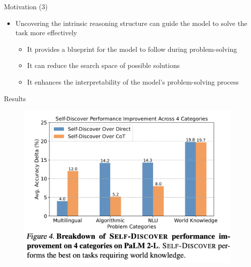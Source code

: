 \documentclass[aspectratio=169]{beamer}
\begin{document}
\begin{frame}{Motivation (3)}
\begin{itemize}
    \item Uncovering the intrinsic reasoning structure can guide the model to solve the task more effectively \pause
    \begin{itemize}
    \item It provides a blueprint for the model to follow during problem-solving \pause
    \item It can reduce the search space of possible solutions \pause
    \item It enhances the interpretability of the model's problem-solving process \pause
    \end{itemize}
\end{itemize}
\end{frame}

\begin{frame}{Results}
\begin{figure}
    \centering
    \includegraphics[width=0.65\linewidth]{results1.png}
\end{figure}
\end{frame}
\end{document}
